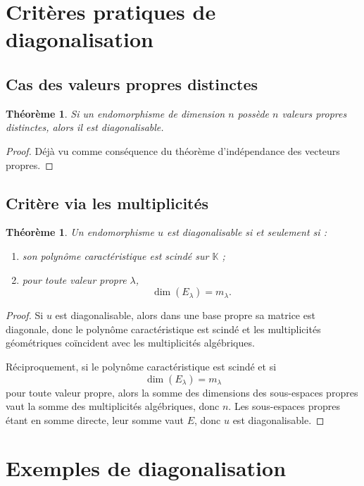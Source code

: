 \documentclass[11pt,a4paper]{article}
\newtheorem{theoreme}[definition]{Théorème}
\theoremstyle{remark}
\newcommand{\K}{\mathbb{K}}
\begin{document}
\section{Critères pratiques de diagonalisation}

\subsection{Cas des valeurs propres distinctes}

\begin{theoreme}
Si un endomorphisme de dimension \(n\) possède \(n\) valeurs propres distinctes, alors il est diagonalisable.
\end{theoreme}

\begin{proof}
Déjà vu comme conséquence du théorème d’indépendance des vecteurs propres.
\end{proof}

\subsection{Critère via les multiplicités}

\begin{theoreme}
Un endomorphisme \(u\) est diagonalisable si et seulement si :
\begin{enumerate}[label=\arabic*)]
    \item son polynôme caractéristique est scindé sur \(\K\) ;
    \item pour toute valeur propre \(\lambda\),
    \[
    \dim(E_\lambda)=m_\lambda.
    \]
\end{enumerate}
\end{theoreme}

\begin{proof}
Si \(u\) est diagonalisable, alors dans une base propre sa matrice est diagonale, donc le polynôme caractéristique est scindé et les multiplicités géométriques coïncident avec les multiplicités algébriques.

Réciproquement, si le polynôme caractéristique est scindé et si
\[
\dim(E_\lambda)=m_\lambda
\]
pour toute valeur propre, alors la somme des dimensions des sous-espaces propres vaut la somme des multiplicités algébriques, donc \(n\). Les sous-espaces propres étant en somme directe, leur somme vaut \(E\), donc \(u\) est diagonalisable.
\end{proof}

\section{Exemples de diagonalisation}
\end{document}
